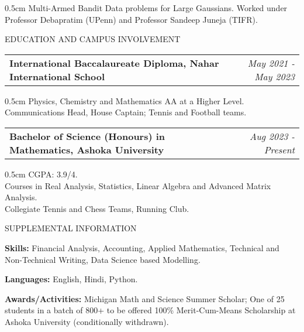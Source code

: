 \documentclass[10pt]{article}
\newenvironment{myenv}{\begin{adjustwidth}{0.5cm}{}}{\end{adjustwidth}}
\newcommand\tab[1][0.5cm]{\hspace*{#1}}
\begin{document}
\begin{myenv}
Multi-Armed Bandit Data problems for Large Gaussians. Worked under Professor Debapratim (UPenn) and Professor Sandeep Juneja (TIFR).
\end{myenv}

\bigskip
\noindent
\vspace{3pt}
{\large \textcolor{bluetwo}{EDUCATION AND CAMPUS INVOLVEMENT}}
\vspace{3pt}
\hline
\vspace{6pt}

\noindent
\begin{tabularx}{\linewidth}{Xr}
\textbf{International Baccalaureate Diploma, Nahar International School} & \textit{May 2021 - May 2023} \\
\end{tabularx}

\begin{myenv}
Physics, Chemistry and Mathematics AA at a Higher Level. \\
Communications Head, House Captain; Tennis and Football teams.
\end{myenv}

\smallskip

\noindent
\begin{tabularx}{\linewidth}{Xr}
\textbf{Bachelor of Science (Honours) in Mathematics, Ashoka University} & \textit{Aug 2023 - Present} \\
\end{tabularx}

\begin{myenv}
CGPA: 3.9/4. \\
Courses in Real Analysis, Statistics, Linear Algebra and Advanced Matrix Analysis. \\
Collegiate Tennis and Chess Teams, Running Club.
\end{myenv}

\bigskip
\noindent
\vspace{3pt}
{\large \textcolor{bluetwo}{SUPPLEMENTAL INFORMATION}}
\vspace{3pt}
\hline
\vspace{6pt}

\textbf{Skills:}
Financial Analysis, Accounting, Applied Mathematics, Technical and Non-Technical Writing, Data Science \tab based Modelling.

 \textbf{Languages:}
English, Hindi, Python.

 \textbf{Awards/Activities:}
Michigan Math and Science Summer Scholar; One of 25 students in a batch of 800+ to be \tab offered 100\% Merit-Cum-Means Scholarship at Ashoka University (conditionally withdrawn).
\end{document}
